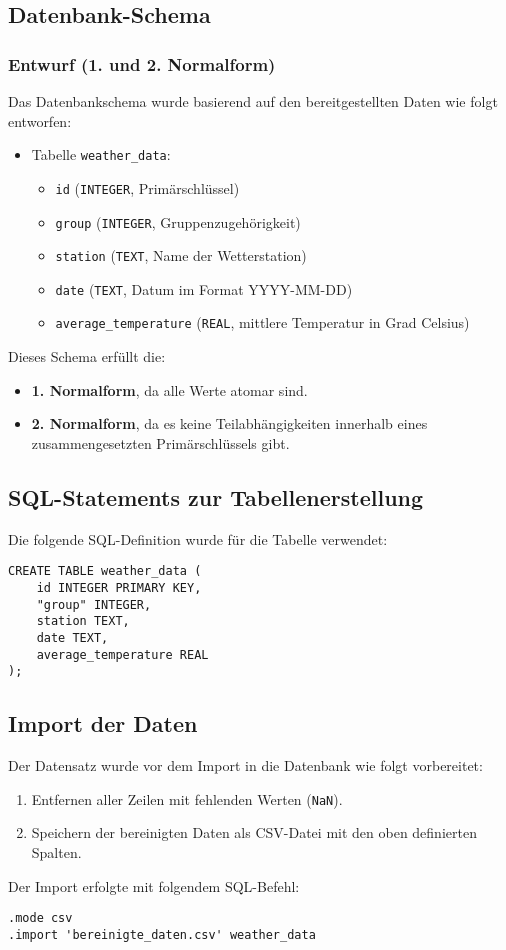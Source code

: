 \documentclass[a4paper,12pt]{article}
\begin{document}
\subsection{Datenbank-Schema}
\subsubsection*{Entwurf (1. und 2. Normalform)}
Das Datenbankschema wurde basierend auf den bereitgestellten Daten wie folgt entworfen:
\begin{itemize}
    \item Tabelle \texttt{weather\_data}:
    \begin{itemize}
        \item \texttt{id} (\texttt{INTEGER}, Primärschlüssel)
        \item \texttt{group} (\texttt{INTEGER}, Gruppenzugehörigkeit)
        \item \texttt{station} (\texttt{TEXT}, Name der Wetterstation)
        \item \texttt{date} (\texttt{TEXT}, Datum im Format YYYY-MM-DD)
        \item \texttt{average\_temperature} (\texttt{REAL}, mittlere Temperatur in Grad Celsius)
    \end{itemize}
\end{itemize}
Dieses Schema erfüllt die:
\begin{itemize}
    \item \textbf{1. Normalform}, da alle Werte atomar sind.
    \item \textbf{2. Normalform}, da es keine Teilabhängigkeiten innerhalb eines zusammengesetzten Primärschlüssels gibt.
\end{itemize}

\subsection{SQL-Statements zur Tabellenerstellung}
Die folgende SQL-Definition wurde für die Tabelle verwendet:
\begin{verbatim}
CREATE TABLE weather_data (
    id INTEGER PRIMARY KEY,
    "group" INTEGER,
    station TEXT,
    date TEXT,
    average_temperature REAL
);
\end{verbatim}

\subsection{Import der Daten}
Der Datensatz wurde vor dem Import in die Datenbank wie folgt vorbereitet:
\begin{enumerate}
    \item Entfernen aller Zeilen mit fehlenden Werten (\texttt{NaN}).
    \item Speichern der bereinigten Daten als CSV-Datei mit den oben definierten Spalten.
\end{enumerate}
Der Import erfolgte mit folgendem SQL-Befehl:
\begin{verbatim}
.mode csv
.import 'bereinigte_daten.csv' weather_data
\end{verbatim}
\end{document}
